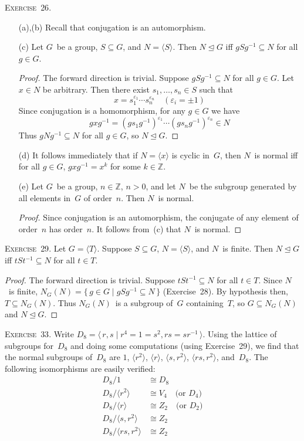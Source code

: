 \documentclass[letterpaper]{article}
\newcommand{\exercise}[1]{\goodbreak\noindent\textsc{Exercise~{#1}.}}
\newcommand{\Z}{\mathbb{Z}}
\newcommand{\iso}{\cong}
\newcommand{\normal}{\trianglelefteq}
\newcommand{\gen}[1]{\langle{#1}\rangle}
\begin{document}
\exercise{26}
\begin{enumerate}[itemsep=0pt]
\item[(a),(b)] Recall that conjugation is an automorphism.
\item[(c)] Let $G$~be a group, $S\subseteq G$, and $N=\gen{S}$. Then $N\normal G$ iff $gSg^{-1}\subseteq N$ for all $g\in G$.
\begin{proof}
The forward direction is trivial. Suppose $gSg^{-1}\subseteq N$ for all $g\in G$. Let $x\in N$ be arbitrary. Then there exist $s_1,\ldots,s_n\in S$ such that
$$x=s_1^{\varepsilon_1}\cdots s_n^{\varepsilon_n}\quad(\varepsilon_i=\pm1)$$
Since conjugation is a homomorphism, for any $g\in G$ we have
$$gxg^{-1}=(gs_1g^{-1})^{\varepsilon_1}\cdots(gs_ng^{-1})^{\varepsilon_n}\in N$$
Thus $gNg^{-1}\subseteq N$ for all $g\in G$, so $N\normal G$.
\end{proof}
\item[(d)] It follows immediately that if $N=\gen{x}$ is cyclic in~$G$, then $N$~is normal iff for all $g\in G$, $gxg^{-1}=x^k$ for some $k\in\Z$.
\item[(e)] Let $G$~be a group, $n\in\Z$, $n>0$, and let $N$~be the subgroup generated by all elements in~$G$ of order~$n$. Then $N$~is normal.
\begin{proof}
Since conjugation is an automorphism, the conjugate of any element of order~$n$ has order~$n$. It follows from~(c) that $N$~is normal.
\end{proof}
\end{enumerate}

\exercise{29}
Let $G=\gen{T}$. Suppose $S\subseteq G$, $N=\gen{S}$, and $N$~is finite. Then $N\normal G$ iff $tSt^{-1}\subseteq N$ for all $t\in T$.
\begin{proof}
The forward direction is trivial. Suppose $tSt^{-1}\subseteq N$ for all $t\in T$. Since $N$~is finite, $N_G(N)=\{\,g\in G\mid gSg^{-1}\subseteq N\,\}$ (Exercise~28). By hypothesis then, $T\subseteq N_G(N)$. Thus $N_G(N)$~is a subgroup of~$G$ containing~$T$, so $G\subseteq N_G(N)$ and $N\normal G$.
\end{proof}

\exercise{33}
Write $D_8=\gen{\,r,s\mid r^4=1=s^2, rs=sr^{-1}\,}$. Using the lattice of subgroups for~$D_8$ and doing some computations (using Exercise~29), we find that the normal subgroups of~$D_8$ are $1$, $\gen{r^2}$, $\gen{r}$, $\gen{s,r^2}$, $\gen{rs,r^2}$, and~$D_8$. The following isomorphisms are easily verified:
\begin{align*}
D_8/1&\iso D_8\\
D_8/\gen{r^2}&\iso V_4\quad\text{(or~$D_4$)}\\
D_8/\gen{r}&\iso Z_2\quad\text{(or~$D_2$)}\\
D_8/\gen{s,r^2}&\iso Z_2\\
D_8/\gen{rs,r^2}&\iso Z_2
\end{align*}
\end{document}
